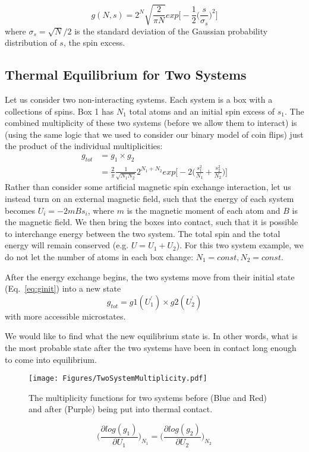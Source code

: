 \begin{equation}
g(N,s) = 2^N \sqrt{\frac{2}{\pi N}} exp\bigg[-\frac{1}{2}\bigg(\frac{s}{\sigma_s}\bigg)^2\bigg]
\end{equation}
where $\sigma_s = \sqrt{N}/2$ is the standard deviation of the Gaussian probability 
distribution of $s$, the spin excess.

\subsection{Thermal Equilibrium for Two Systems}
Let us consider two non-interacting systems. Each system is a box with a collections of
spins. Box 1 has $N_1$ total atoms and an initial spin excess of $s_1$.
The combined multiplicity of these 
two systems (before we allow them to interact) is (using the same logic that we used to consider
our binary model of coin flips) just the product of the individual multiplicities:
\begin{align}
g_{tot} &= g_1 \times g_2 \\
        &= \frac{2}{\pi} \frac{1}{\sqrt{N_1 N_2}} 2^{N_1 + N_2} exp\bigg[-2\bigg(\frac{s_1^2}{N_1} + 
        \frac{s_2^2}{N_2}\bigg)\bigg]
\label{eq:ginit}
\end{align}
Rather than consider some artificial magnetic spin exchange interaction, let us instead
turn on an external magnetic field, such that the energy of each system becomes
$U_i = -2 m B s_i$, where $m$ is the magnetic moment of each atom and $B$ is the magnetic
field. We then bring the boxes into contact, such that it is possible to interchange energy
between the two system. The total spin and the total energy will remain conserved
(e.g. $U = U_1 + U_2$). For this two system example, we do not let the number of atoms in
each box change: $N_1 = const, N_2 = const$.

After the energy exchange begins, the two systems move from their 
initial state (Eq.~\ref{eq:ginit}) into a new state
\begin{equation}
g_{tot} = g1(U_1^\prime) \times g2(U_2^\prime)
\end{equation}
with more accessible microstates.

We would like to find what the new equilibrium state is. In other words, what is the most probable
state after the two systems have been in contact long enough to come into equilibrium.
\begin{figure}[h]
\centering
\texttt{[image: Figures/TwoSystemMultiplicity.pdf]}
\caption{The multiplicity functions for two systems before (Blue and Red) and after (Purple) being put 
	into thermal contact.}
\end{figure}

\begin{equation}
\bigg(\frac{\partial log(g_1)}{\partial U_1}\bigg)_{N_1} = 
\bigg(\frac{\partial log(g_2)}{\partial U_2}\bigg)_{N_2}
\label{eq:maxmicro}
\end{equation}
